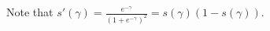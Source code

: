 \begin{enumerate}

\begin{mdframed}
Note that $s'(\gamma) = \frac{e^{-\gamma}}{(1 + e^{-\gamma})^2} = s(\gamma)(1 - s(\gamma))$.


\end{mdframed}
\end{enumerate}
